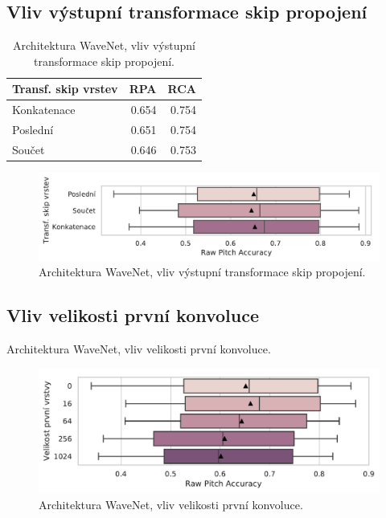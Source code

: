 \subsection{Vliv výstupní transformace skip propojení}

\begin{table}[h!]
\centering
    \begin{tabular}{lrr}
    \toprule
    Transf. skip vrstev &   RPA &   RCA \\
    \midrule
            Konkatenace & 0.654 & 0.754 \\
            Poslední & 0.651 & 0.754 \\
                Součet & 0.646 & 0.753 \\
    \bottomrule
    \end{tabular}

\caption{Architektura WaveNet, vliv výstupní transformace skip propojení.}\label{tab:wavenet_skip_reduction}
\end{table}

\begin{figure}[h]\centering
    \includegraphics[scale=0.6]{../img/figures/wavenet_skip_reduction.pdf}
\caption{Architektura WaveNet, vliv výstupní transformace skip propojení.}\label{obr:wavenet_skip_reduction}
\end{figure}

\subsection{Vliv velikosti první konvoluce}

\begin{table}[h!]
\centering
\caption{Architektura WaveNet, vliv velikosti první konvoluce.}\label{tab:wavenet_first_layer}
\end{table}

\begin{figure}[h]\centering
    \includegraphics[scale=0.6]{../img/figures/wavenet_first_layer.pdf}
\caption{Architektura WaveNet, vliv velikosti první konvoluce.}\label{obr:wavenet_first_layer}
\end{figure}

